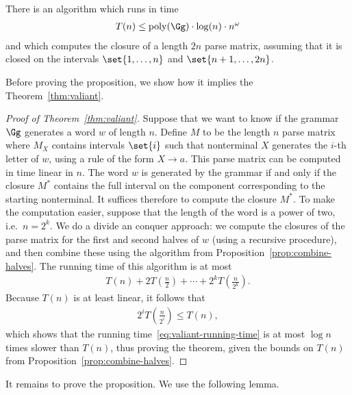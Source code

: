 \begin{proposition}\label{prop:combine-halves}
There is an algorithm which runs in time
\begin{align*}
T(n) \leq \mathrm{poly}(\Gg) \cdot \log(n) \cdot n^\omega
\end{align*}
and which computes the closure of a length $2n$ parse matrix,  assuming that it is closed on the intervals $\set{1,\ldots,n}$ and $\set{n+1,\ldots,2n}$.
\end{proposition}

Before proving the proposition, we show how it implies the Theorem~\ref{thm:valiant}.

\begin{proof}[Proof of Theorem~\ref{thm:valiant}]
Suppose that we want to know if the grammar $\Gg$ generates a word $w$ of length $n$. Define $M$ to be the length $n$ parse matrix where $M_X$ contains intervals $\set{i}$ such that nonterminal $X$ generates the $i$-th letter of $w$, using a rule of the form $X \to a$.
This parse matrix can be computed in time linear in $n$. 
The word $w$ is generated by the grammar if and only if the closure $M^*$ contains the full interval on the component corresponding to the starting nonterminal. It suffices therefore to compute the closure $M^*$. To make the computation easier, suppose that the length of the word is a power of two, i.e.~$n=2^k$. We do a divide an conquer approach: we compute the closures of the parse matrix for the first and second halves of $w$  (using a recursive procedure), and then combine these using the algorithm from Proposition~\ref{prop:combine-halves}. The running time of this algorithm is at most
\begin{align}\label{eq:valiant-running-time}
  T(n) + 2T(\frac n 2) + \cdots + 2^k T(\frac n {2^k}).
\end{align}	
Because $T(n)$ is at least linear, it follows that
\begin{align*}
  2^i T(\frac n {2^i}) \le T(n),
\end{align*}
which shows that the running time~\eqref{eq:valiant-running-time} is at most $\log n$ times slower than $T(n)$, thus proving the theorem, given the bounds on $T(n)$ from Proposition~\ref{prop:combine-halves}. \end{proof}

It remains to prove the proposition. We use the following lemma.



